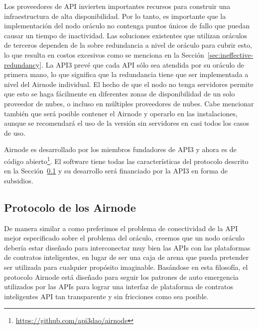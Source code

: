 \documentclass[11pt]{article}
\begin{document}
Los proveedores de API invierten importantes recursos para construir una infraestructura de alta disponibilidad. Por lo tanto, es importante que la implementación del nodo oráculo no contenga puntos únicos de fallo que puedan causar un tiempo de inactividad. Las soluciones existentes que utilizan oráculos de terceros dependen de la sobre redundancia a nivel de oráculo para cubrir esto, lo que resulta en costos excesivos como se menciona en la Sección~\ref{sec:ineffective-redundancy}.
La API3 prevé que cada API sólo sea atendida por su oráculo de primera mano, lo que significa que la redundancia tiene que ser implementada a nivel del Airnode individual. El hecho de que el nodo no tenga servidores permite que esto se haga fácilmente en diferentes zonas de disponibilidad de un solo proveedor de nubes, o incluso en múltiples proveedores de nubes. Cabe mencionar también que será posible contener el Airnode y operarlo en las instalaciones, aunque se recomendará el uso de la versión sin servidores en casi todos los casos de uso.

Airnode es desarrollado por los miembros fundadores de API3 y ahora es de código abierto\footnote{\url{https://github.com/api3dao/airnode}}. El software tiene todas las características del protocolo descrito en la Sección~\ref{sec:airnode-protocol} y su desarrollo será financiado por la API3 en forma de subsidios.

\subsection{Protocolo de los Airnode}
\label{sec:airnode-protocol}

De manera similar a como preferimos el problema de conectividad de la API mejor especificado sobre el problema del oráculo, creemos que un nodo oráculo debería estar diseñado para interconectar muy bien las APIs con las plataformas de contratos inteligentes, en lugar de ser una caja de arena que pueda pretender ser utilizada para cualquier propósito imaginable. Basándose en esta filosofía, el protocolo Airnode está diseñado para seguir los patrones de auto emergencia utilizados por las APIs para lograr una interfaz de plataforma de contratos inteligentes API tan transparente y sin fricciones como sea posible.
\end{document}
